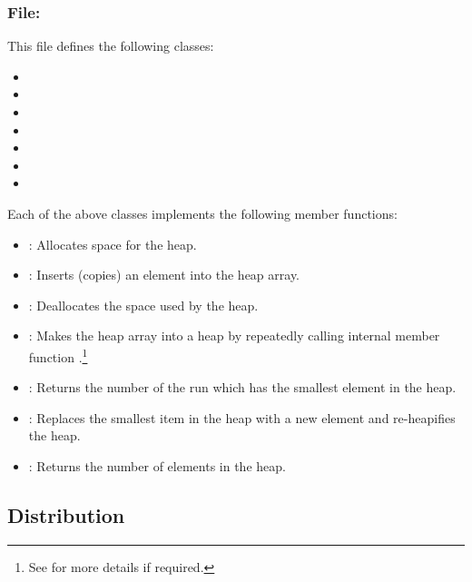 \subsubsection{File: }

This file defines the following classes:
\begin{itemize}
    \item {}
    \item {}
    \item {}
    \item {}
    \item {}
    \item {}
    \item {}
\end{itemize}

Each of the above classes implements the following member
functions:
\begin{itemize}
    \item {}: Allocates space for the heap.
    \item {}: Inserts (copies) an element into
    the heap array.
    \item {}: Deallocates the space used by the heap.
    \item {}: Makes the heap array into a heap
    by repeatedly calling internal member function
    .\footnote{%
       See \cite{cormen:textbook} for more details if
       required.}
    \item {}: Returns the number of the
    run which has the smallest element in the heap.
    \item {}: Replaces the
    smallest item in the heap with a new element  and
    re-heapifies the heap.
    \item {}: Returns the number of elements
    in the heap.
\end{itemize}




\subsection{Distribution}

